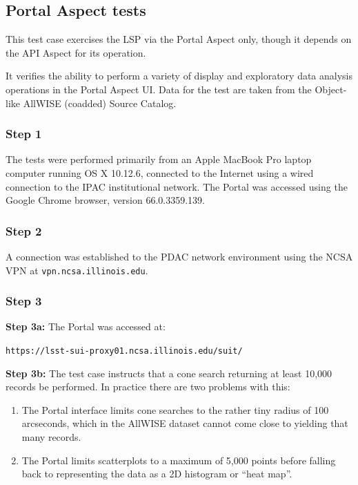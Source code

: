 
\subsection{Portal Aspect tests}

This test case exercises the LSP via the Portal Aspect only,
though it depends on the API Aspect for its operation.

It verifies the ability to perform a variety of display and exploratory data analysis
operations in the Portal Aspect UI.
Data for the test are taken from the Object-like AllWISE (coadded) Source Catalog.

\subsubsection{Step 1}

The tests were performed primarily from an Apple MacBook Pro laptop computer running OS X 10.12.6,
connected to the Internet using a wired connection to the IPAC institutional network.
The Portal was accessed using the Google Chrome browser, version 66.0.3359.139.

\subsubsection{Step 2}

A connection was established to the PDAC network environment using the NCSA VPN at \texttt{vpn.ncsa.illinois.edu}.

\subsubsection{Step 3}

\textbf{Step 3a:} The Portal was accessed at:

\begin{center}
\texttt{https://lsst-sui-proxy01.ncsa.illinois.edu/suit/}
\end{center}

\textbf{Step 3b:} The test case instructs that a cone search returning at least 10,000 records be performed.
In practice there are two problems with this:

\begin{enumerate}
\item{The Portal interface limits cone searches to the rather tiny radius of 100 arcseconds,
which in the AllWISE dataset cannot come close to yielding that many records.}
\item{The Portal limits scatterplots to a maximum of 5,000 points before falling back to representing the data as a 2D histogram or ``heat map''.}
\end{enumerate}

